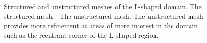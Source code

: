 \begin{figure}
	\caption[Structured and unstructured meshes.]{Structured and unstructured meshes of the L-shaped domain.  \protect{} The structured mesh.  \protect{}~The unstructured mesh. The unstructured mesh provides more refinement at areas of more interest in the domain such as the reentrant corner of the L-shaped region.}
	\label{fig:meshTypes}
\end{figure}

